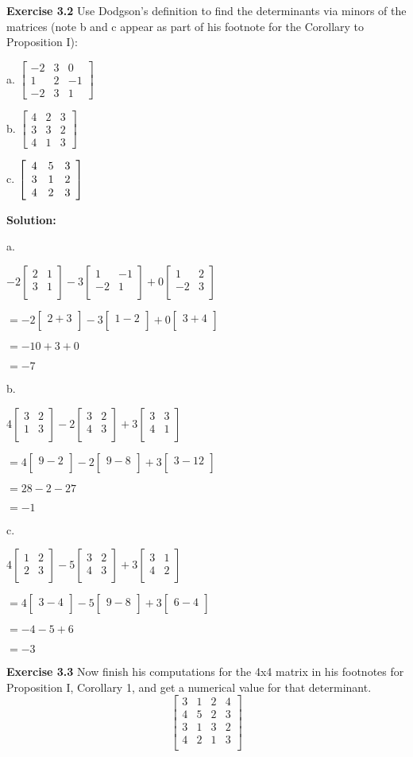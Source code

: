 \documentclass[12pt]{article}
\newcommand{\sol} {\textbf{Solution:}}
\newcommand{\matx}[1] {
\begin{bmatrix}
  #1 \\
\end{bmatrix}
}
\newcommand{\matxx}[2] {
\begin{bmatrix}
  #1 \\
  #2 \\
\end{bmatrix}
}
\newcommand{\matxxxx}[4] {
\begin{bmatrix}
  #1 \\
  #2 \\
  #3 \\
  #4 \\
\end{bmatrix}
}
\begin{document}
\bigskip
\noindent\textbf{Exercise 3.2} Use Dodgson's definition to find the
determinants via minors of the matrices (note b and c appear as part of his
footnote for the Corollary to Proposition I):

a. $%
\begin{bmatrix}
-2 & 3 & 0\\
1 & 2 & -1\\
-2 & 3 & 1
\end{bmatrix}
$

b. $%
\begin{bmatrix}
4 & 2 & 3\\
3 & 3 & 2\\
4 & 1 & 3
\end{bmatrix}
$

c. $\left[
\begin{array}
[c]{ccc}%
4 & 5 & 3\\
3 & 1 & 2\\
4 & 2 & 3
\end{array}
\right]  $

\bigskip

\sol

a.

\(-2 \matxx{2 & 1}{3 & 1} -3 \matxx{1 & -1}{-2 & 1} + 0 \matxx{1 &2}{-2 &3}\)

\(=-2 \matx{2 + 3} -3 \matx{1 - 2} + 0\matx{3 + 4}\)

\(= -10 + 3 + 0\)

\(= -7 \)

\bigskip
b.

\(4 \matxx{3 & 2}{1 & 3} -2 \matxx{3 & 2}{4 & 3} + 3 \matxx{3 &3}{4 &1}\)

\(=4 \matx{9 - 2} -2 \matx{9 - 8} + 3\matx{3 - 12}\)

\(= 28 - 2 - 27\)

\(= -1 \)

\bigskip
c.

\(4 \matxx{1 & 2}{2 & 3} -5 \matxx{3 & 2}{4 & 3} + 3 \matxx{3 &1}{4 &2}\)

\(=4 \matx{3 - 4} -5 \matx{9 - 8} + 3\matx{6 - 4}\)

\(= -4 - 5 + 6\)

\(= -3 \)


\bigskip
\noindent\textbf{Exercise 3.3} Now finish his computations for the 4x4 matrix
in his footnotes for Proposition I, Corollary 1, and get a numerical value for
that determinant.
\[
\matxxxx{3&1&2&4}
		{4&5&2&3}
       	{3&1&3&2}
        {4&2&1&3}
\]


\bigskip
\end{document}
